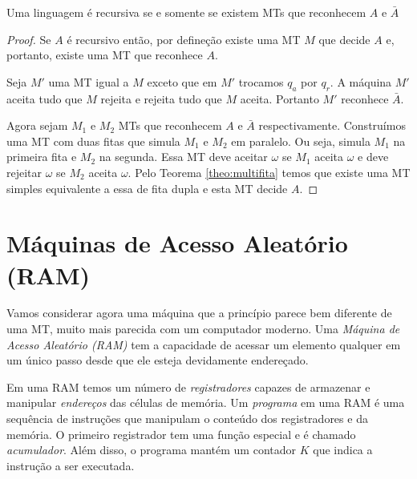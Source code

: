 \begin{theorem}
  Uma linguagem é recursiva se e somente se existem MTs que reconhecem $A$ e $\bar{A}$
\end{theorem}
\begin{proof}
  Se $A$ é recursivo então, por defineção existe uma MT $M$ que decide $A$ e, portanto, existe uma MT que reconhece $A$.

  Seja $M'$ uma MT igual a $M$ exceto que em $M'$ trocamos $q_a$ por $q_r$.
  A máquina $M'$ aceita tudo que $M$ rejeita e rejeita tudo que $M$ aceita.
  Portanto $M'$ reconhece $\bar{A}$.

  Agora sejam $M_1$ e $M_2$ MTs que reconhecem $A$ e $\bar{A}$ respectivamente.
  Construímos uma MT com duas fitas que simula $M_1$ e $M_2$ em paralelo.
  Ou seja, simula $M_1$ na primeira fita e $M_2$ na segunda.
  Essa MT deve aceitar $\omega$ se $M_1$ aceita $\omega$ e deve rejeitar $\omega$ se $M_2$ aceita $\omega$.
  Pelo Teorema \ref{theo:multifita} temos que existe uma MT simples equivalente a essa de fita dupla e esta MT decide $A$.
\end{proof}

\section{Máquinas de Acesso Aleatório (RAM)}
\label{sec:ram}

Vamos considerar agora uma máquina que a princípio parece bem diferente de uma MT, muito mais parecida com um computador moderno.
Uma {\em Máquina de Acesso Aleatório (RAM)} tem a capacidade de acessar um elemento qualquer em um único passo desde que ele esteja devidamente endereçado.

Em uma RAM temos um número de {\em registradores} capazes de armazenar e manipular {\em endereços} das células de memória.
Um {\em programa} em uma RAM é uma sequência de instruções que manipulam o conteúdo dos registradores e da memória.
O primeiro registrador tem uma função especial e é chamado {\em acumulador}.
Além disso, o programa mantém um contador $K$ que indica a instrução a ser executada.

\begin{center}
\end{center}

